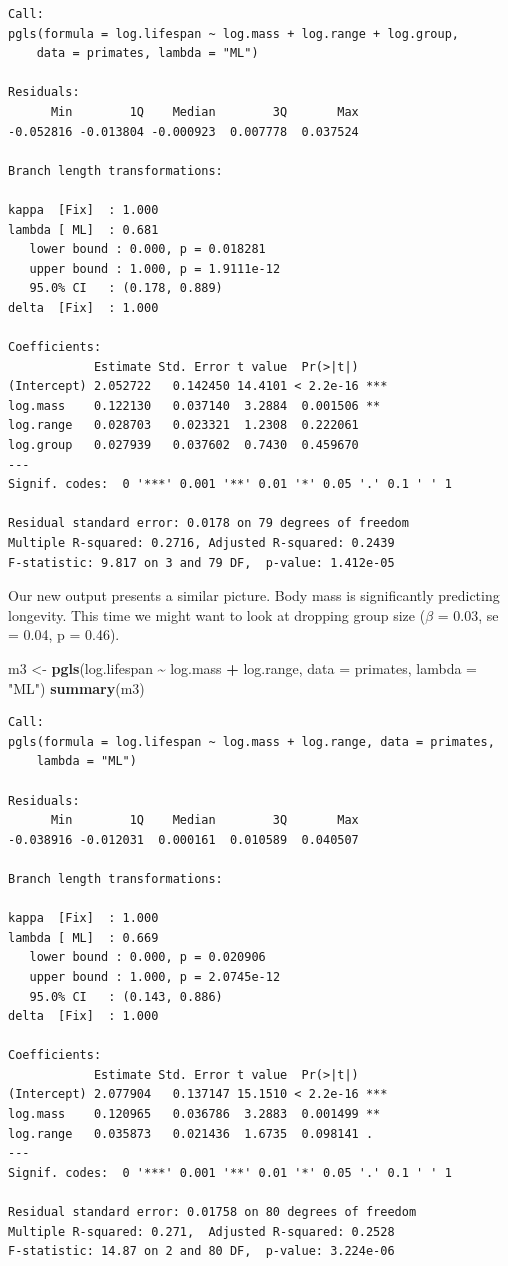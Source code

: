 \documentclass[
]{book}
\newenvironment{Shaded}{\begin{snugshade}}{\end{snugshade}}
\newcommand{\DataTypeTok}[1]{\textcolor[rgb]{0.13,0.29,0.53}{#1}}
\newcommand{\KeywordTok}[1]{\textcolor[rgb]{0.13,0.29,0.53}{\textbf{#1}}}
\newcommand{\NormalTok}[1]{#1}
\newcommand{\OperatorTok}[1]{\textcolor[rgb]{0.81,0.36,0.00}{\textbf{#1}}}
\newcommand{\StringTok}[1]{\textcolor[rgb]{0.31,0.60,0.02}{#1}}
\begin{document}
\begin{verbatim}
Call:
pgls(formula = log.lifespan ~ log.mass + log.range + log.group, 
    data = primates, lambda = "ML")

Residuals:
      Min        1Q    Median        3Q       Max 
-0.052816 -0.013804 -0.000923  0.007778  0.037524 

Branch length transformations:

kappa  [Fix]  : 1.000
lambda [ ML]  : 0.681
   lower bound : 0.000, p = 0.018281
   upper bound : 1.000, p = 1.9111e-12
   95.0% CI   : (0.178, 0.889)
delta  [Fix]  : 1.000

Coefficients:
            Estimate Std. Error t value  Pr(>|t|)    
(Intercept) 2.052722   0.142450 14.4101 < 2.2e-16 ***
log.mass    0.122130   0.037140  3.2884  0.001506 ** 
log.range   0.028703   0.023321  1.2308  0.222061    
log.group   0.027939   0.037602  0.7430  0.459670    
---
Signif. codes:  0 '***' 0.001 '**' 0.01 '*' 0.05 '.' 0.1 ' ' 1

Residual standard error: 0.0178 on 79 degrees of freedom
Multiple R-squared: 0.2716, Adjusted R-squared: 0.2439 
F-statistic: 9.817 on 3 and 79 DF,  p-value: 1.412e-05 
\end{verbatim}

Our new output presents a similar picture. Body mass is significantly predicting longevity. This time we might want to look at dropping group size (\(\beta\) = 0.03, se = 0.04, p = 0.46).

\begin{Shaded}
\begin{Highlighting}[]
\NormalTok{m3 \textless{}{-}}\StringTok{ }\KeywordTok{pgls}\NormalTok{(log.lifespan }\OperatorTok{\textasciitilde{}}\StringTok{ }\NormalTok{log.mass }\OperatorTok{+}\StringTok{ }\NormalTok{log.range,}
           \DataTypeTok{data =}\NormalTok{ primates, }\DataTypeTok{lambda =} \StringTok{"ML"}\NormalTok{)}
\KeywordTok{summary}\NormalTok{(m3)}
\end{Highlighting}
\end{Shaded}

\begin{verbatim}
Call:
pgls(formula = log.lifespan ~ log.mass + log.range, data = primates, 
    lambda = "ML")

Residuals:
      Min        1Q    Median        3Q       Max 
-0.038916 -0.012031  0.000161  0.010589  0.040507 

Branch length transformations:

kappa  [Fix]  : 1.000
lambda [ ML]  : 0.669
   lower bound : 0.000, p = 0.020906
   upper bound : 1.000, p = 2.0745e-12
   95.0% CI   : (0.143, 0.886)
delta  [Fix]  : 1.000

Coefficients:
            Estimate Std. Error t value  Pr(>|t|)    
(Intercept) 2.077904   0.137147 15.1510 < 2.2e-16 ***
log.mass    0.120965   0.036786  3.2883  0.001499 ** 
log.range   0.035873   0.021436  1.6735  0.098141 .  
---
Signif. codes:  0 '***' 0.001 '**' 0.01 '*' 0.05 '.' 0.1 ' ' 1

Residual standard error: 0.01758 on 80 degrees of freedom
Multiple R-squared: 0.271,  Adjusted R-squared: 0.2528 
F-statistic: 14.87 on 2 and 80 DF,  p-value: 3.224e-06 
\end{verbatim}
\end{document}
